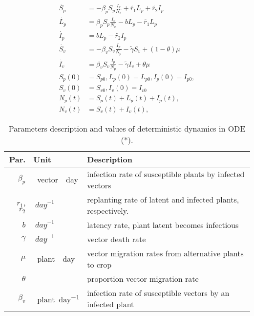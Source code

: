 \begin{equation}
	\label{sys::DeterministicSystem} 
	\begin{aligned} 
		\dot{S_p} &= 
			-\beta_p S_p
			\frac{I_v}{N_v} + \tilde{r_1} L_p + \tilde{r_2} I_p  
		\\ 
		\dot{L_p} &= 
			\beta_p S_p
			\frac{I_v}{N_v} - b L_p - \tilde{r_1} L_p  
		\\ 
		\dot{I_p} &= 
			b L_p - \tilde{r_2} I_p  \\ 
		\dot{S_v} &= 
			-\beta_v S_v 
			\frac{I_p}{N_p} - \tilde{\gamma} S_v
			+(1-\theta) \mu  
		\\ 
		\dot{I_v} &= 
			\beta_v S_v \frac{I_p}{N_p} 
			- \tilde{\gamma} I_v
			+ \theta \mu 
			 \\
			S_p(0) &=S_{p0}, 
            L_p(0) = L_{p0},
            I_p(0) = I_{p0},
            \\
             S_v(0) &= S_{v0},
              I_v(0) = I_{v0}
             \\
             N_p(t) &= S_p(t) + L_p(t) + I_p(t),
             \\
             N_v(t) &= S_v(t) + I_v(t),
	\end{aligned} 
\end{equation} 
\begin{table}
	\begin{center}
		\begin{tabular}{rll} 
			\toprule
			Par. & Unit & Description 
			\\ 
			\midrule
				$\beta_p$ 
				& 
					\SI{}{vector \per day}
				& 
					infection rate of susceptible 
					plants by infected vectors 
			\\ 
				$r_1$, $r_2$ 
				& 
					$\SI{}{day}^{-1}$ 
				& 
					replanting rate of latent and 
					infected plants, respectively. 
			\\
				$b$ 
				& 
					$\SI{}{day}^{-1}$ 
				& 
					latency rate, plant latent 
					becomes infectious 
			\\
				$\gamma$ 
				& 
					$\SI{}{day}^{-1}$ 
				&  vector death rate 
			\\
				$\mu$ 
				& \SI{}{plant \per day}
				& vector migration rates from alternative plants to crop
			\\
				$\theta$ 
				& 
				& proportion vector migration rate
			\\
				$\beta_v$ 
				& \SI{}{plant\per day}
				& infection rate of susceptible vectors by an infected plant
			\\
			\bottomrule
		\end{tabular}
	\end{center}
	\caption{
		Parameters description and values of
		deterministic dynamics in ODE (*).
	}
	\label{tbl:deterministic_tbl}
\end{table}
